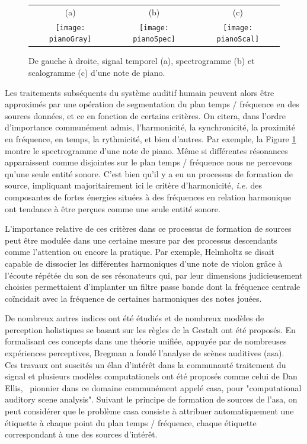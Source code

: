 \begin{figure}[t]
  \footnotesize
  \begin{tabular}{ccc}
    (a) & (b) & (c)  \\
    \texttt{[image: pianoGray]} &
    \texttt{[image: pianoSpec]} &
    \texttt{[image: pianoScal]}  \\
  \end{tabular}
  \caption{De gauche à droite, signal temporel (a), spectrogramme (b) et scalogramme (c) d'une note de piano.}
  \label{fig:piano}
\end{figure}

Les traitements subséquents du système auditif humain peuvent alors être approximés par une opération de segmentation du plan temps / fréquence en des sources données, et ce en fonction de certains critères.  On citera, dans l'ordre d'importance communément admis, l'harmonicité, la synchronicité, la proximité en fréquence, en temps, la rythmicité, et bien d'autres. Par exemple, la Figure \ref{fig:piano} montre le spectrogramme d'une note de piano. Même si différentes résonances apparaissent comme disjointes sur le plan temps / fréquence nous ne percevons qu'une seule entité sonore. C'est bien qu'il y a eu un processus de formation de source, impliquant majoritairement ici le critère d'harmonicité, \textit{i.e.} des composantes de fortes énergies situées à des fréquences en relation harmonique ont tendance à être perçues comme une seule entité sonore.


L'importance relative de ces critères dans ce processus de formation de sources peut être modulée dans une certaine mesure par des processus descendants comme l'attention ou encore la pratique. Par exemple, Helmholtz se disait capable de dissocier les différentes harmoniques d'une note de violon grâce à l'écoute répétée du son de ses résonateurs qui, par leur dimensions judicieusement choisies permettaient d'implanter un filtre passe bande dont la fréquence centrale coïncidait avec la fréquence de certaines harmoniques des notes jouées.

De nombreux autres indices ont été étudiés et de nombreux modèles de perception holistiques se basant sur les règles de la Gestalt\cite{koffka2013principles} ont été proposés. En formalisant ces concepts dans une théorie unifiée, appuyée par de nombreuses expériences perceptives, Bregman a fondé l'analyse de scènes auditives (asa).~\cite{bregman1994auditory} Ces travaux ont suscités un élan d'intérêt dans la communauté traitement du signal et plusieurs modèles computationels ont été proposés comme celui de Dan Ellis,~\cite{ellis1996prediction} pionnier dans ce domaine communément appelé casa, pour "computational auditory scene analysis". Suivant le principe de formation de sources de l'asa, on peut considérer que le problème casa consiste à attribuer automatiquement une étiquette à chaque point du plan temps / fréquence, chaque étiquette correspondant à une des sources d'intérêt.

